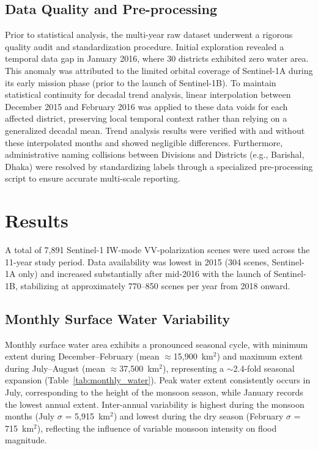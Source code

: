 \documentclass[fleqn,10pt,twocolumn]{article}
\begin{document}
\subsection{Data Quality and Pre-processing}
Prior to statistical analysis, the multi-year raw dataset underwent a rigorous quality audit and standardization procedure. Initial exploration revealed a temporal data gap in January 2016, where 30 districts exhibited zero water area. This anomaly was attributed to the limited orbital coverage of Sentinel-1A during its early mission phase (prior to the launch of Sentinel-1B). To maintain statistical continuity for decadal trend analysis, linear interpolation between December 2015 and February 2016 was applied to these data voids for each affected district, preserving local temporal context rather than relying on a generalized decadal mean. Trend analysis results were verified with and without these interpolated months and showed negligible differences. Furthermore, administrative naming collisions between Divisions and Districts (e.g., Barishal, Dhaka) were resolved by standardizing labels through a specialized pre-processing script to ensure accurate multi-scale reporting.


\section{Results}

A total of 7,891 Sentinel-1 IW-mode VV-polarization scenes were used across the 11-year study period. Data availability was lowest in 2015 (304 scenes, Sentinel-1A only) and increased substantially after mid-2016 with the launch of Sentinel-1B, stabilizing at approximately 770--850 scenes per year from 2018 onward.

\subsection{Monthly Surface Water Variability}

Monthly surface water area exhibits a pronounced seasonal cycle, with minimum extent during December--February (mean $\approx$15,900~km$^2$) and maximum extent during July--August (mean $\approx$37,500~km$^2$), representing a $\sim$2.4-fold seasonal expansion (Table~\ref{tab:monthly_water}). Peak water extent consistently occurs in July, corresponding to the height of the monsoon season, while January records the lowest annual extent. Inter-annual variability is highest during the monsoon months (July $\sigma$ = 5,915~km$^2$) and lowest during the dry season (February $\sigma$ = 715~km$^2$), reflecting the influence of variable monsoon intensity on flood magnitude.
\end{document}
